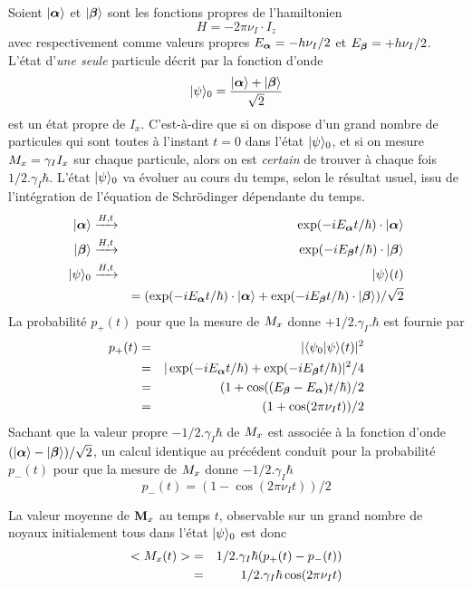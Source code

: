 Soient $|\boldsymbol{\alpha}\rangle$ et $|\boldsymbol{\beta}\rangle$ sont les fonctions propres de l'hamiltonien
\begin{equation}
H = -2\pi\nu_I \cdot I_z 
\end{equation}
avec respectivement comme valeurs propres $E_{\boldsymbol{\alpha}}=-h\nu_I/2$ et $E_{\boldsymbol{\beta}}=+h\nu_I/2$.
L'état d'\emph{une seule} particule décrit par la fonction d'onde
\begin{equation}
|\psi\rangle_0 = \frac{|\boldsymbol{\alpha}\rangle + |\boldsymbol{\beta}\rangle}{\sqrt{2}}
\end{equation}
est un état propre de $I_x$.
C'est-à-dire que si on dispose d'un grand nombre de particules
qui sont toutes à l'instant $t=0$ dans l'état $|\psi\rangle_0$,
et si on mesure $M_x = \gamma_I I_x$ sur chaque particule,
alors on est \emph{certain} de trouver à chaque fois $1/2.\gamma_I\hbar$.
L'état $|\psi\rangle_0$ va évoluer
au cours du temps, selon le résultat usuel, issu de l'intégration
de l'équation de Schrödinger dépendante du temps.
\begin{eqnarray}
|\boldsymbol{\alpha}\rangle & \xrightarrow{H,t} & \exp(-iE_{\boldsymbol{\alpha}}t/\hbar)\cdot |\boldsymbol{\alpha}\rangle\\
|\boldsymbol{\beta}\rangle & \xrightarrow{H,t} & \exp(-iE_{\boldsymbol{\beta}}t/\hbar)\cdot |\boldsymbol{\beta}\rangle\\
|\psi\rangle_0 & \xrightarrow{H,t} & |\psi\rangle(t) \nonumber\\
& & = (\exp(-iE_{\boldsymbol{\alpha}}t/\hbar) \cdot |\boldsymbol{\alpha}\rangle + \exp(-iE_{\boldsymbol{\beta}}t/\hbar) \cdot |\boldsymbol{\beta}\rangle)/\sqrt{2}
\end{eqnarray}
La probabilité $p_+(t)$ pour que la mesure de $M_x$ donne $+1/2.\gamma_I.\hbar$
est fournie par 
\begin{eqnarray}
p_+(t) & = & |\langle\psi_0 |\psi\rangle(t)|^2 \nonumber\\
& = & |\exp(-iE_{\boldsymbol{\alpha}}t/\hbar) + \exp(-iE_{\boldsymbol{\beta}}t/\hbar)|^2/4 \nonumber\\
& = & (1 + \cos((E_{\boldsymbol{\beta}} -E_{\boldsymbol{\alpha}})t/\hbar)/2 \label{eqn:interf}\\
& = & (1 + \cos(2\pi\nu_It))/2
\end{eqnarray}
Sachant que la valeur propre $-1/2.\gamma_I\hbar$ de $M_x$ est associée
à la fonction d'onde $(|\boldsymbol{\alpha}\rangle - |\boldsymbol{\beta}\rangle)/\sqrt{2}$,
un calcul identique au précédent conduit pour la probabilité 
$p_-(t)$ pour que la mesure de $M_x$ donne $-1/2.\gamma_I\hbar$
\begin{equation}
p_-(t)  =  (1 - \cos(2\pi\nu_It))/2
\end{equation}

La valeur moyenne de $\mathbf{M}_x$ au temps $t$, observable sur un grand nombre
de noyaux initialement tous dans l'état $|\psi\rangle_0$ est donc
\begin{eqnarray}
<M_x(t)> & = & 1/2.\gamma_I\hbar(p_+(t) - p_-(t)) \nonumber\\
& = & 1/2.\gamma_I\hbar\cos(2\pi\nu_It)
\end{eqnarray}

